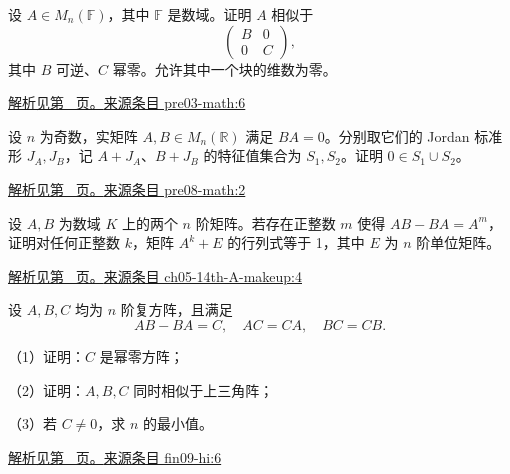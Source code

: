\documentclass[12pt,fontset=fandol]{ctexart}
\begin{document}
\begin{example}\label{ex:pre03-math:6}

设 $A\in M_n(\mathbb F)$，其中 $\mathbb F$ 是数域。证明 $A$ 相似于
\[
\begin{pmatrix}B&0\\0&C\end{pmatrix},
\]
其中 $B$ 可逆、$C$ 幂零。允许其中一个块的维数为零。

\par\hyperref[ans:pre03-math:6]{解析见第~\pageref{ans:pre03-math:6} 页。}\quad\href{https://github.com/lzxcr/cmc-mathematics/blob/64916fa1fdbc3e444a652eca204d5669058ee321/src/problems/preliminary/03/06.md}{来源条目 pre03-math:6}

\end{example}

\begin{example}\label{ex:pre08-math:2}

设 $n$ 为奇数，实矩阵 $A,B\in M_n(\mathbb R)$ 满足 $BA=0$。分别取它们的 Jordan 标准形 $J_A,J_B$，记 $A+J_A$、$B+J_B$ 的特征值集合为 $S_1,S_2$。证明 $0\in S_1\cup S_2$。

\par\hyperref[ans:pre08-math:2]{解析见第~\pageref{ans:pre08-math:2} 页。}\quad\href{https://github.com/lzxcr/cmc-mathematics/blob/64916fa1fdbc3e444a652eca204d5669058ee321/src/problems/preliminary/08/02.md}{来源条目 pre08-math:2}

\end{example}

\begin{example}\label{ex:ch05-14th-A-makeup:4}

设 $A,B$ 为数域 $K$ 上的两个 $n$ 阶矩阵。若存在正整数 $m$ 使得 $AB-BA=A^m$，证明对任何正整数 $k$，矩阵 $A^k+E$ 的行列式等于 1，其中 $E$ 为 $n$ 阶单位矩阵。

\par\hyperref[ans:ch05-14th-A-makeup:4]{解析见第~\pageref{ans:ch05-14th-A-makeup:4} 页。}\quad\href{https://github.com/lzxcr/cmc-mathematics/blob/64916fa1fdbc3e444a652eca204d5669058ee321/src/problems/preliminary/14-makeup/04.md}{来源条目 ch05-14th-A-makeup:4}

\end{example}

\begin{example}\label{ex:fin09-hi:6}

设 $A, B, C$ 均为 $n$ 阶复方阵，且满足
\[
AB - BA = C, \quad AC = CA, \quad BC = CB.
\]

（1）证明：$C$ 是幂零方阵；

（2）证明：$A, B, C$ 同时相似于上三角阵；

（3）若 $C \neq 0$，求 $n$ 的最小值。

\par\hyperref[ans:fin09-hi:6]{解析见第~\pageref{ans:fin09-hi:6} 页。}\quad\href{https://github.com/lzxcr/cmc-mathematics/blob/64916fa1fdbc3e444a652eca204d5669058ee321/src/problems/finals/09/06.md}{来源条目 fin09-hi:6}

\end{example}
\end{document}
